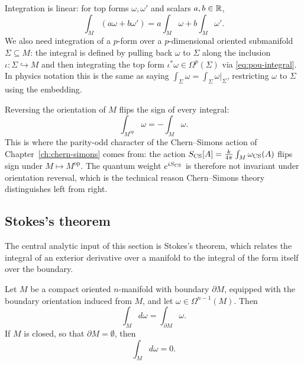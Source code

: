 \medskip

\noindent Integration is linear: for top forms $\omega, \omega'$ and scalars $a, b \in \mathbb{R}$,
\begin{equation*}
\int_M (a\omega + b\omega') = a \int_M \omega + b \int_M \omega'.
\end{equation*}
We also need integration of a $p$-form over a $p$-dimensional oriented submanifold $\Sigma \subseteq M$: the integral is defined by pulling back $\omega$ to $\Sigma$ along the inclusion $\iota : \Sigma \hookrightarrow M$ and then integrating the top form $\iota^* \omega \in \Omega^p(\Sigma)$ via \eqref{eq:pou-integral}. In physics notation this is the same as saying $\int_\Sigma \omega = \int_\Sigma \omega|_\Sigma$, restricting $\omega$ to $\Sigma$ using the embedding.

\begin{remark}\label{rem:orientation}
Reversing the orientation of $M$ flips the sign of every integral:
\begin{equation*}
\int_{M^{\mathrm{op}}} \omega = - \int_M \omega.
\end{equation*}
This is where the parity-odd character of the Chern--Simons action of Chapter~\ref{ch:chern-simons} comes from: the action $S_{\operatorname{CS}}[A] = \tfrac{k}{4\pi}\int_M \omega_{\operatorname{CS}}(A)$ flips sign under $M \mapsto M^{\mathrm{op}}$. The quantum weight $e^{i S_{\operatorname{CS}}}$ is therefore not invariant under orientation reversal, which is the technical reason Chern--Simons theory distinguishes left from right.
\end{remark}

\subsection{Stokes's theorem}

The central analytic input of this section is Stokes's theorem, which relates the integral of an exterior derivative over a manifold to the integral of the form itself over the boundary.

\begin{theorem}[Stokes]\label{thm:ch2-stokes}
Let $M$ be a compact oriented $n$-manifold with boundary $\partial M$, equipped with the boundary orientation induced from $M$, and let $\omega \in \Omega^{n-1}(M)$. Then
\begin{equation}\label{eq:ch2-stokes}
\int_M d\omega = \int_{\partial M} \omega.
\end{equation}
If $M$ is closed, so that $\partial M = \emptyset$, then
\begin{equation}\label{eq:ch2-stokes-closed}
\int_M d\omega = 0.
\end{equation}
\end{theorem}

